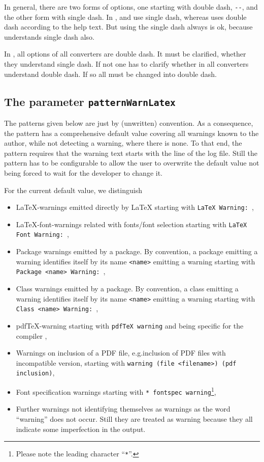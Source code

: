 In general, there are two forms of options, one starting with double dash, \texttt{-{}-}, 
and the other form with single dash. 
In \texlive, \pdflatex{} and \xelatex{} use single dash, 
whereas \lualatex{} uses double dash according to the help text. 
But using the single dash always is ok, 
because \lualatex{} understands single dash also. 

In \miktex, all options of all converters are double dash. 
It must be clarified, whether they understand single dash. 
If not one has to clarify whether in \texlive{} all converters understand double dash. 
If so all must be changed into double dash. 


\subsection{The parameter \texttt{patternWarnLatex}}%
\label{subsec:patternWarnLatex}

The patterns given below are just by (unwritten) convention. 
As a consequence, the pattern has a comprehensive default value 
covering all warnings known to the author, 
while not detecting a warning, where there is none. 
To that end, the pattern requires 
that the warning text starts with the line of the log file. 
Still the pattern has to be configurable 
to allow the user to overwrite the default value 
not being forced to wait for the developer 
to change it. 

For the current default value, we distinguish 
%
\begin{itemize}
\item
\LaTeX-warnings emitted directly by \LaTeX{} 
starting with \texttt{LaTeX Warning: }, 
\item
\LaTeX-font-warnings related with fonts/font selection 
starting with \texttt{LaTeX Font Warning: }, 
\item
Package warnings emitted by a package. 
By convention, a package emitting a warning identifies itself 
by its name \texttt{<name>}
emitting a warning starting with \texttt{Package <name> Warning: }, 
\item
Class warnings emitted by a package. 
By convention, a class emitting a warning identifies itself 
by its name \texttt{<name>}
emitting a warning starting with \texttt{Class <name> Warning: }, 
\item
pdf\TeX-warning starting with \texttt{pdfTeX warning} 
and being specific for the compiler \pdflatex, 
\item 
Warnings on inclusion of a PDF file, 
e.g.\@ inclusion of PDF files with incompatible version, 
starting with \texttt{warning  (file <filename>) (pdf inclusion)}, 
\item
Font specification warnings starting with \texttt{* fontspec warning}\footnote%
{Please note the leading character ``\texttt{*}''. }, 
\item
Further warnings not identifying themselves as warnings 
as the word ``warning'' does not occur. 
Still they are treated as warning 
because they all indicate some imperfection in the output. 
\end{itemize}

